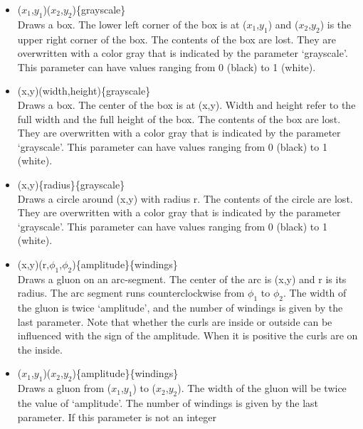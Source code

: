 \begin{itemize}
    If the file colordvi.sty is present the first argument will be 
    executed. If this file is not present the second argument will be 
    executed. For examples, see some of the figures. This command can also 
    be used in the regular text of the \LaTeX{} file.
\item {}($x_1$,$y_1$)($x_2$,$y_2$)\{grayscale\} \hfill \\
    Draws a box. The lower left corner of the box is at ($x_1$,$y_1$) and 
    ($x_2$,$y_2$) is the upper right corner of the box. The contents of 
    the box are lost. They are overwritten with a color gray that is 
    indicated by the parameter `grayscale'. This parameter can have 
    values ranging from 0 (black) to 1 (white).
\item {}(x,y)(width,height)\{grayscale\} \hfill \\
    Draws a box. The center of the box is at (x,y). Width and height refer 
    to the full width and the full height of the box. The contents of 
    the box are lost. They are overwritten with a color gray that is 
    indicated by the parameter `grayscale'. This parameter can have 
    values ranging from 0 (black) to 1 (white).
\item {}(x,y)\{radius\}\{grayscale\} \hfill \\
    Draws a circle around (x,y) with radius r. The contents of 
    the circle are lost. They are overwritten with a color gray that is 
    indicated by the parameter `grayscale'. This parameter can have 
    values ranging from 0 (black) to 1 (white).
\item {}(x,y)(r,$\phi_1$,$\phi_2$)\{amplitude\}\{windings\} \hfill \\
    Draws a gluon on an arc-segment. The center of the arc is (x,y) and r 
    is its radius. The arc segment runs counterclockwise from $\phi_1$ 
    to $\phi_2$. The width of the gluon is twice `amplitude', and the 
    number of windings is given by the last parameter. Note that whether 
    the curls are inside or outside can be influenced with the sign of 
    the amplitude. When it is positive the curls are on the inside.
\item {}($x_1$,$y_1$)($x_2$,$y_2$)\{amplitude\}\{windings\} \hfill \\
    Draws a gluon from ($x_1$,$y_1$) to ($x_2$,$y_2$). The width of the 
    gluon will be twice the value of `amplitude'. The number of windings 
    is given by the last parameter. If this parameter is not an integer 

\end{itemize}
